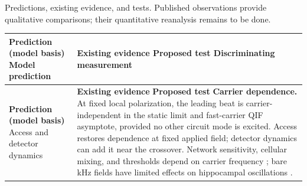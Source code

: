 \documentclass[11pt,a4paper]{article}
\providecommand{\DIFaddtex}[1]{{\protect\color{blue} \sf #1}} %
\providecommand{\DIFdeltex}[1]{{\protect\color{red} \scriptsize #1}} %
\providecommand{\DIFaddbegin}{} %
\providecommand{\DIFdelbegin}{} %
\providecommand{\DIFdelend}{} %
\providecommand{\DIFaddFL}[1]{\DIFadd{#1}} %
\providecommand{\DIFdelFL}[1]{\DIFdel{#1}} %
\providecommand{\DIFaddbeginFL}{} %
\providecommand{\DIFaddendFL}{} %
\providecommand{\DIFdelbeginFL}{} %
\providecommand{\DIFdelendFL}{} %
\providecommand{\DIFadd}[1]{\texorpdfstring{\DIFaddtex{#1}}{#1}} %
\providecommand{\DIFdel}[1]{\texorpdfstring{\DIFdeltex{#1}}{}} %
\begin{document}
\DIFdelbegin %
\DIFdelend \DIFaddbegin \begin{table}[htbp]
\centering\DIFaddendFL \small
\renewcommand{\arraystretch}{1.15}
\DIFdelbeginFL %
{%
\DIFdelFL{Predictions, existing evidence, and tests. Published observations provide
qualitative comparisons; their quantitative reanalysis remains to be done.}}
\DIFdelendFL \DIFaddbeginFL \begin{tabular}{@{}>{\raggedright\arraybackslash}p{}
 >{\raggedright\arraybackslash}p{}@{}}
\DIFaddendFL \toprule
\DIFdelbeginFL \DIFdelFL{\textbf{Prediction (model basis)} }\DIFdelendFL \DIFaddbeginFL \DIFaddFL{Model prediction }\DIFaddendFL & \DIFdelbeginFL \DIFdelFL{\textbf{Existing evidence} }%
\DIFdelFL{\textbf{Proposed test} }\DIFdelendFL \DIFaddbeginFL \DIFaddFL{Discriminating measurement }\DIFaddendFL \\
\midrule
\DIFdelbeginFL %
\DIFdelFL{\textbf{Prediction (model basis)} }\DIFdelendFL \DIFaddbeginFL \DIFaddFL{Access and detector dynamics }\DIFaddendFL & \DIFdelbeginFL \DIFdelFL{\textbf{Existing evidence} }%
\DIFdelFL{\textbf{Proposed test} }%
\DIFdelFL{\textbf{Carrier dependence.} At fixed local polarization, the leading beat is
carrier-independent in the static limit and fast-carrier QIF asymptote, provided
no other circuit mode is excited. Access restores dependence at fixed applied
field; detector dynamics can add it near the crossover.
}%
\DIFdelFL{Network sensitivity, cellular mixing, and thresholds depend on carrier frequency \cite{esmaeilpour2021,luff2024mixer,opancar2025,peripheral2023}; bare kHz fields
have limited effects on hippocampal oscillations \cite{esmaeilpour2020}.
}
\end{tabular}
\end{table}
\end{document}
